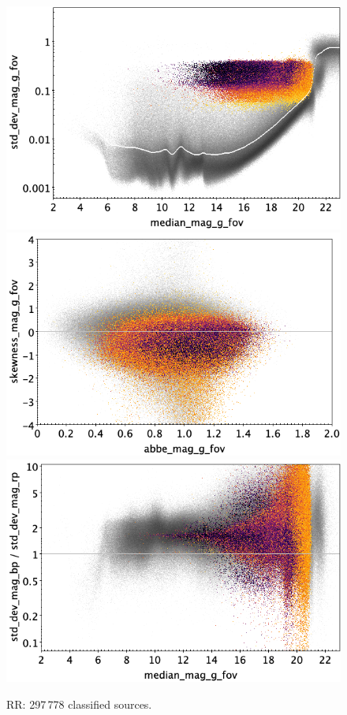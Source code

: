 \documentclass[longauth]{aa}
\begin{document}
\begin{appendix}
\begin{figure}
\hspace{2mm}
 \includegraphics[width=0.45\hsize]{figures/appendix/RR_cls_msd.png} \\ %
\vspace{4mm}
 \includegraphics[width=0.45\hsize]{figures/appendix/RR_cls_ask.png}  %
\hspace{2mm}
 \includegraphics[width=0.45\hsize]{figures/appendix/RR_cls_msdr.png}  \\ %
\vspace{4mm}
 \caption{RR: 297\,778 classified sources.}  
 \label{fig:app:RR}
\end{figure}


\end{appendix}
\end{document}
